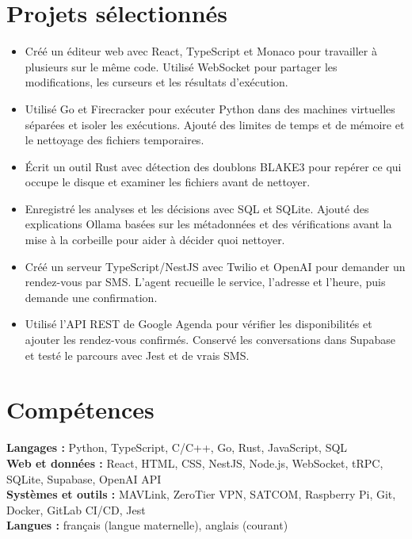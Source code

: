 \section{Projets sélectionnés}
\begin{itemize}
  \item Créé un éditeur web avec React, TypeScript et Monaco pour travailler à plusieurs sur le même code. Utilisé WebSocket pour partager les modifications, les curseurs et les résultats d’exécution.
  \item Utilisé Go et Firecracker pour exécuter Python dans des machines virtuelles séparées et isoler les exécutions. Ajouté des limites de temps et de mémoire et le nettoyage des fichiers temporaires.
\end{itemize}
\begin{itemize}
  \item Écrit un outil Rust avec détection des doublons BLAKE3 pour repérer ce qui occupe le disque et examiner les fichiers avant de nettoyer.
  \item Enregistré les analyses et les décisions avec SQL et SQLite. Ajouté des explications Ollama basées sur les métadonnées et des vérifications avant la mise à la corbeille pour aider à décider quoi nettoyer.
\end{itemize}
\begin{itemize}
  \item Créé un serveur TypeScript/NestJS avec Twilio et OpenAI pour demander un rendez-vous par SMS. L’agent recueille le service, l’adresse et l’heure, puis demande une confirmation.
  \item Utilisé l’API REST de Google Agenda pour vérifier les disponibilités et ajouter les rendez-vous confirmés. Conservé les conversations dans Supabase et testé le parcours avec Jest et de vrais SMS.
\end{itemize}

\section{Compétences}
\textbf{Langages :} Python, TypeScript, C/C++, Go, Rust, JavaScript, SQL\\
\textbf{Web et données :} React, HTML, CSS, NestJS, Node.js, WebSocket, tRPC, SQLite, Supabase, OpenAI API\\
\textbf{Systèmes et outils :} MAVLink, ZeroTier VPN, SATCOM, Raspberry Pi, Git, Docker, GitLab CI/CD, Jest\\
\textbf{Langues :} français (langue maternelle), anglais (courant)


